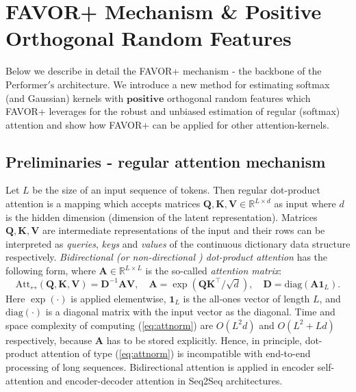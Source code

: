 \section{FAVOR+ Mechanism \& Positive Orthogonal Random Features}
\label{sec:algorithm}
Below we describe in detail the FAVOR+ mechanism - the backbone of the $\mathrm{Performer's}$ architecture. We introduce a new method for estimating softmax (and Gaussian) kernels with $\textbf{positive}$ orthogonal random features which FAVOR+ leverages for the robust and unbiased estimation of regular (softmax) attention and show how FAVOR+ can be applied for other attention-kernels.

\subsection{Preliminaries - regular attention mechanism}

Let $L$ be the size of an input sequence of tokens. Then regular dot-product attention \citep{transformer} is a mapping which accepts matrices $\mathbf{Q}, \mathbf{K}, \mathbf{V} \in \mathbb{R}^{L \times d}$ as input where $d$ is the hidden dimension (dimension of the latent representation). Matrices $\mathbf{Q}, \mathbf{K}, \mathbf{V}$ are intermediate representations of the input and their rows can be interpreted as \textit{queries}, \textit{keys} and \textit{values} of the continuous dictionary data structure respectively. \textit{Bidirectional (or non-directional \citep{bert}) dot-product attention} has the following form, where  $\mathbf{A} \in \mathbb{R}^{L \times L}$ is the so-called \textit{attention matrix}:
\begin{equation}
\label{eq:attnorm}
    \mathrm{Att}_\leftrightarrow (\mathbf{Q}, \mathbf{K}, \mathbf{V}) = \mathbf{D}^{-1} \mathbf{A} \mathbf{V}, \quad %
    \mathbf{A} = \exp ( \mathbf{Q} \mathbf{K}^\top / \sqrt{d}), \quad \mathbf{D} = \mathrm{diag} ( \mathbf{A} \mathbf{1}_L ). 
\end{equation}    
Here $\exp (\cdot)$ is applied elementwise, $\mathbf{1}_L$ is the all-ones vector of length $L$, and $\mathrm{diag} (\cdot)$ is a diagonal matrix with the input vector as the diagonal. Time and space complexity of computing (\ref{eq:attnorm}) are $O(L^2 d)$ and $O(L^{2}+Ld)$ respectively, because $\mathbf{A}$ has to be stored explicitly. Hence, in principle, dot-product attention of type (\ref{eq:attnorm}) is incompatible with end-to-end processing of long sequences. Bidirectional attention is applied in encoder self-attention and encoder-decoder attention in Seq2Seq architectures.

